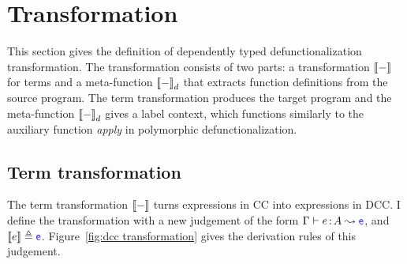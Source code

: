 
\section{Transformation}
\label{sec:4.3}

This section gives the definition of dependently typed defunctionalization transformation.
The transformation consists of two parts: a transformation ${[\![ - ]\!]}$ for terms and a meta-function ${[\![ - ]\!]}_d$ that extracts function definitions from the source program. The term transformation produces the target program and the meta-function ${[\![ - ]\!]}_d$ gives a label context, which functions similarly to the auxiliary function \textit{apply} in polymorphic defunctionalization.

\subsection{Term transformation}

The term transformation ${[\![ - ]\!]}$ turns expressions in CC into expressions in DCC. I define the transformation with a new judgement of the form $\Gamma \vdash e \goodcolon A \leadsto \target{e}$, and $\bbracket{e} \triangleq \target{e}$. Figure~\ref{fig:dcc transformation} gives the derivation rules of this judgement.

